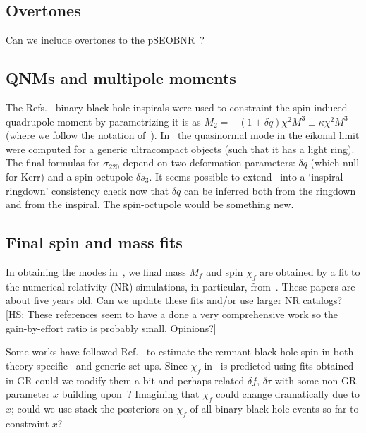 \documentclass[aps,10pt,preprint,
               notitlepage,onecolumn,superscriptaddress,
               eqsecnum,
               nofootinbib,tightenlines,floatfix]{revtex4-1}
\newcommand{\hs}[1]{{\color{magenta}[HS: #1]}}
\begin{document}
\subsection{Overtones}
%
Can we include overtones to the pSEOBNR~\cite{Brito:2018rfr,Ghosh:2021mrv}?


\subsection{QNMs and multipole moments}
%
The Refs.~\cite{Krishnendu:2017shb,Krishnendu:2019tjp} binary black hole
inspirals were used to constraint the spin-induced quadrupole moment by
parametrizing it is as $M_2 = - (1 + \delta q) \chi^2 M^3 \equiv \kappa \chi^2 M^3$ (where we follow the
notation of~\cite{Glampedakis:2017cgd}).
%
In~\cite{Glampedakis:2017cgd} the quasinormal mode in the eikonal limit were computed
for a generic ultracompact objects (such that it has a light ring).
%
The final formulas for $\sigma_{220}$ depend on two deformation parameters:
$\delta q$ (which null for Kerr) and a spin-octupole $\delta s_{3}$.
%
It seems possible to extend~\cite{Krishnendu:2017shb,Krishnendu:2019tjp}
into a `inspiral-ringdown' consistency check now that $\delta q$ can be inferred
both from the ringdown and from the inspiral. The spin-octupole would be something new.


\subsection{Final spin and mass fits}
%
In obtaining the modes in~\cite{Ghosh:2021mrv}, we final mass $M_f$ and spin
$\chi_f$ are obtained by a fit to the numerical relativity (NR) simulations, in
particular, from~\cite{Taracchini:2013rva,Hofmann:2016yih}.
%
These papers are about five years old. Can we update these fits and/or use
larger NR catalogs?
%
\hs{These references seem to have a done a very comprehensive work so the
gain-by-effort ratio is probably small. Opinions?}

Some works have followed Ref.~\cite{Buonanno:2007sv} to estimate the remnant black hole spin
in both theory specific~\cite{Jai-akson:2017ldo} and generic set-ups.
%
Since $\chi_f$ in~\cite{Ghosh:2021mrv} is predicted using fits obtained in GR
could we modify them a bit and perhaps related $\delta f$, $\delta \tau$ with
some non-GR parameter $x$ building upon~\cite{Buonanno:2007sv}?
%
Imagining that $\chi_f$ could change dramatically due to $x$;
could we use stack the posteriors on $\chi_f$ of all binary-black-hole events so far
to constraint $x$?
\end{document}
